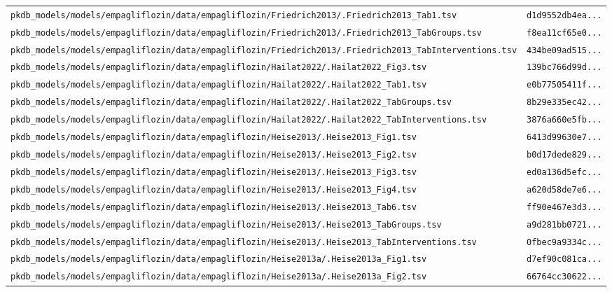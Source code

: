 \begin{longtable}{ll}
\texttt{pkdb\_models/models/empagliflozin/data/empagliflozin/Friedrich2013/.Friedrich2013\_Tab1.tsv} & \texttt{d1d9552db4ea...} \\
\texttt{pkdb\_models/models/empagliflozin/data/empagliflozin/Friedrich2013/.Friedrich2013\_TabGroups.tsv} & \texttt{f8ea11cf65e0...} \\
\texttt{pkdb\_models/models/empagliflozin/data/empagliflozin/Friedrich2013/.Friedrich2013\_TabInterventions.tsv} & \texttt{434be09ad515...} \\
\texttt{pkdb\_models/models/empagliflozin/data/empagliflozin/Hailat2022/.Hailat2022\_Fig3.tsv} & \texttt{139bc766d99d...} \\
\texttt{pkdb\_models/models/empagliflozin/data/empagliflozin/Hailat2022/.Hailat2022\_Tab1.tsv} & \texttt{e0b77505411f...} \\
\texttt{pkdb\_models/models/empagliflozin/data/empagliflozin/Hailat2022/.Hailat2022\_TabGroups.tsv} & \texttt{8b29e335ec42...} \\
\texttt{pkdb\_models/models/empagliflozin/data/empagliflozin/Hailat2022/.Hailat2022\_TabInterventions.tsv} & \texttt{3876a660e5fb...} \\
\texttt{pkdb\_models/models/empagliflozin/data/empagliflozin/Heise2013/.Heise2013\_Fig1.tsv} & \texttt{6413d99630e7...} \\
\texttt{pkdb\_models/models/empagliflozin/data/empagliflozin/Heise2013/.Heise2013\_Fig2.tsv} & \texttt{b0d17dede829...} \\
\texttt{pkdb\_models/models/empagliflozin/data/empagliflozin/Heise2013/.Heise2013\_Fig3.tsv} & \texttt{ed0a136d5efc...} \\
\texttt{pkdb\_models/models/empagliflozin/data/empagliflozin/Heise2013/.Heise2013\_Fig4.tsv} & \texttt{a620d58de7e6...} \\
\texttt{pkdb\_models/models/empagliflozin/data/empagliflozin/Heise2013/.Heise2013\_Tab6.tsv} & \texttt{ff90e467e3d3...} \\
\texttt{pkdb\_models/models/empagliflozin/data/empagliflozin/Heise2013/.Heise2013\_TabGroups.tsv} & \texttt{a9d281bb0721...} \\
\texttt{pkdb\_models/models/empagliflozin/data/empagliflozin/Heise2013/.Heise2013\_TabInterventions.tsv} & \texttt{0fbec9a9334c...} \\
\texttt{pkdb\_models/models/empagliflozin/data/empagliflozin/Heise2013a/.Heise2013a\_Fig1.tsv} & \texttt{d7ef90c081ca...} \\
\texttt{pkdb\_models/models/empagliflozin/data/empagliflozin/Heise2013a/.Heise2013a\_Fig2.tsv} & \texttt{66764cc30622...} \\

\end{longtable}
